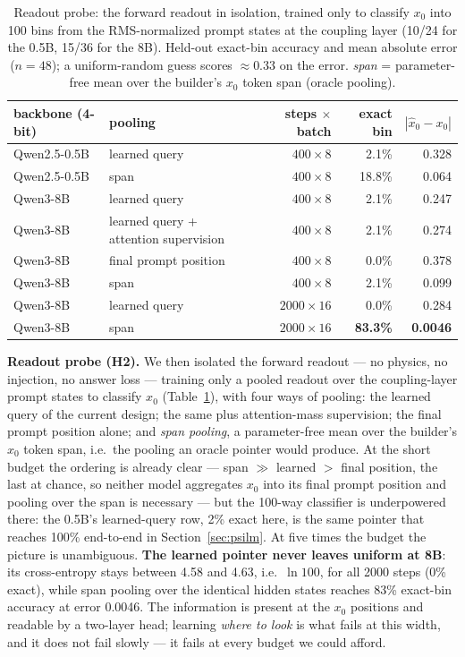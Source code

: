 \documentclass[11pt]{article}
\begin{document}
\begin{table}[t]
\centering
\caption{Readout probe: the forward readout in isolation, trained only to classify $x_0$ into 100 bins from the RMS-normalized prompt states at the coupling layer (10/24 for the 0.5B, 15/36 for the 8B). Held-out exact-bin accuracy and mean absolute error ($n{=}48$); a uniform-random guess scores $\approx0.33$ on the error. \emph{span} = parameter-free mean over the builder's $x_0$ token span (oracle pooling).}
\label{tab:readout}
\small
\begin{tabular}{llrrr}
\toprule
backbone (4-bit) & pooling & steps $\times$ batch & exact bin & $|\hat x_0 - x_0|$ \\
\midrule
Qwen2.5-0.5B & learned query & $400\times8$ & 2.1\% & 0.328 \\
Qwen2.5-0.5B & span & $400\times8$ & 18.8\% & 0.064 \\
\midrule
Qwen3-8B & learned query & $400\times8$ & 2.1\% & 0.247 \\
Qwen3-8B & learned query + attention supervision & $400\times8$ & 2.1\% & 0.274 \\
Qwen3-8B & final prompt position & $400\times8$ & 0.0\% & 0.378 \\
Qwen3-8B & span & $400\times8$ & 2.1\% & 0.099 \\
\midrule
Qwen3-8B & learned query & $2000\times16$ & 0.0\% & 0.284 \\
Qwen3-8B & span & $2000\times16$ & \textbf{83.3\%} & \textbf{0.0046} \\
\bottomrule
\end{tabular}
\end{table}

\textbf{Readout probe (H2).} We then isolated the forward readout --- no physics, no injection, no answer loss --- training only a pooled readout over the coupling-layer prompt states to classify $x_0$ (Table~\ref{tab:readout}), with four ways of pooling: the learned query of the current design; the same plus attention-mass supervision; the final prompt position alone; and \emph{span pooling}, a parameter-free mean over the builder's $x_0$ token span, i.e.\ the pooling an oracle pointer would produce. At the short budget the ordering is already clear --- span $\gg$ learned $>$ final position, the last at chance, so neither model aggregates $x_0$ into its final prompt position and pooling over the span is necessary --- but the 100-way classifier is underpowered there: the 0.5B's learned-query row, 2\% exact here, is the same pointer that reaches 100\% end-to-end in Section~\ref{sec:psilm}. At five times the budget the picture is unambiguous. \textbf{The learned pointer never leaves uniform at 8B}: its cross-entropy stays between 4.58 and 4.63, i.e.\ $\ln 100$, for all 2000 steps (0\% exact), while span pooling over the identical hidden states reaches 83\% exact-bin accuracy at error 0.0046. The information is present at the $x_0$ positions and readable by a two-layer head; learning \emph{where to look} is what fails at this width, and it does not fail slowly --- it fails at every budget we could afford.
\end{document}
